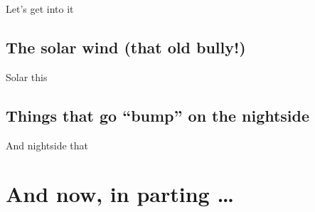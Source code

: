 


Let's get into it

\subsection{The solar wind (that old bully!)}

Solar this 

\subsection{Things that go ``bump'' on the nightside}

And nightside that 

\section{And now, in parting \dots}





